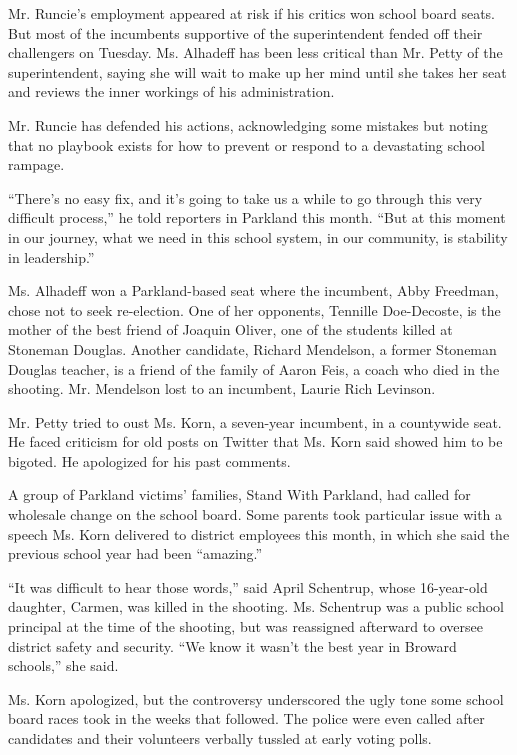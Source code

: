 Mr. Runcie's employment appeared at risk if his critics won school board
seats. But most of the incumbents supportive of the superintendent
fended off their challengers on Tuesday. Ms. Alhadeff has been less
critical than Mr. Petty of the superintendent, saying she will wait to
make up her mind until she takes her seat and reviews the inner workings
of his administration.

Mr. Runcie has defended his actions, acknowledging some mistakes but
noting that no playbook exists for how to prevent or respond to a
devastating school rampage.

``There's no easy fix, and it's going to take us a while to go through
this very difficult process,'' he told reporters in Parkland this month.
``But at this moment in our journey, what we need in this school system,
in our community, is stability in leadership.''

Ms. Alhadeff won a Parkland-based seat where the incumbent, Abby
Freedman, chose not to seek re-election. One of her opponents, Tennille
Doe-Decoste, is the mother of the best friend of Joaquin Oliver, one of
the students killed at Stoneman Douglas. Another candidate, Richard
Mendelson, a former Stoneman Douglas teacher, is a friend of the family
of Aaron Feis, a coach who died in the shooting. Mr. Mendelson lost to
an incumbent, Laurie Rich Levinson.

Mr. Petty tried to oust Ms. Korn, a seven-year incumbent, in a
countywide seat. He faced criticism for old posts on Twitter that Ms.
Korn said showed him to be bigoted. He apologized for his past comments.

A group of Parkland victims' families, Stand With Parkland, had called
for wholesale change on the school board. Some parents took particular
issue with a speech Ms. Korn delivered to district employees this month,
in which she said the previous school year had been ``amazing.''

``It was difficult to hear those words,'' said April Schentrup, whose
16-year-old daughter, Carmen, was killed in the shooting. Ms. Schentrup
was a public school principal at the time of the shooting, but was
reassigned afterward to oversee district safety and security. ``We know
it wasn't the best year in Broward schools,'' she said.

Ms. Korn apologized, but the controversy underscored the ugly tone some
school board races took in the weeks that followed. The police were even
called after candidates and their volunteers verbally tussled at early
voting polls.

